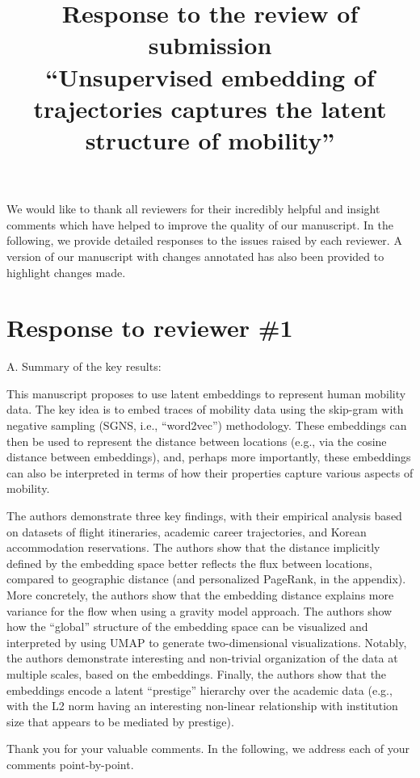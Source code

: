 \documentclass[12pt,a4paper]{article}
\title{Response to the review of submission\\  ``Unsupervised embedding of trajectories captures the latent structure of mobility''}
\date{}
\makeatletter
\newcommand{\response}[1]{{\leavevmode\noindent #1}}
\newcommand{\rcomment}[1]{%
\vspace{10pt}
\begin{tcolorbox}[colback=black!3,colframe=white!45!black]
#1
\end{tcolorbox}
}
\renewcommand{\maketitle}{\bgroup\setlength{\parindent}{0pt}
\begin{flushleft}
\Large  \textbf{\@title}
\end{flushleft}\egroup
}
\makeatother
\begin{document}
\maketitle

We would like to thank all reviewers for their incredibly helpful and insight comments which have helped to improve the quality of our manuscript.
In the following, we provide detailed responses to the issues raised by each reviewer.
A version of our manuscript with changes annotated has also been provided to highlight changes made.

\section*{Response to reviewer \#1}

\rcomment{%
A. Summary of the key results:

This manuscript proposes to use latent embeddings to represent human mobility data. The key idea is to embed traces of mobility data using the skip-gram with negative sampling (SGNS, i.e., “word2vec”) methodology. These embeddings can then be used to represent the distance between locations (e.g., via the cosine distance between embeddings), and, perhaps more importantly, these embeddings can also be interpreted in terms of how their properties capture various aspects of mobility.

The authors demonstrate three key findings, with their empirical analysis based on datasets of flight itineraries, academic career trajectories, and Korean accommodation reservations.
The authors show that the distance implicitly defined by the embedding space better reflects the flux between locations, compared to geographic distance (and personalized PageRank, in the appendix). More concretely, the authors show that the embedding distance explains more variance for the flow when using a gravity model approach.
The authors show how the “global” structure of the embedding space can be visualized and interpreted by using UMAP to generate two-dimensional visualizations. Notably, the authors demonstrate interesting and non-trivial organization of the data at multiple scales, based on the embeddings.
Finally, the authors show that the embeddings encode a latent “prestige” hierarchy over the academic data (e.g., with the L2 norm having an interesting non-linear relationship with institution size that appears to be mediated by prestige).
}

\response{%
Thank you for your valuable comments. 
In the following, we address each of your comments point-by-point.
}
\end{document}
